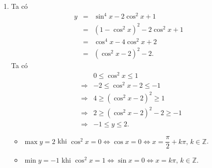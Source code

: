 \begin{ex}
{\begin{enumerate}
\begin{itemize}
			\end{itemize}
			 \item Ta có \allowdisplaybreaks
			\begin{eqnarray*}
				y& =& \sin^4 x - 2\cos^2  x + 1 \\
				&=& (1-\cos^2 x)^2 - 2\cos^2  x + 1\\
				& =& \cos^4 x - 4\cos^2 x + 2  \\
				&=& (\cos^2  x - 2)^2 - 2.
			\end{eqnarray*}
			 Ta có
			\allowdisplaybreaks 
			\begin{eqnarray*}
				&&0 \leq \cos^2 x \leq  1 \\
				&\Rightarrow& -2 \leq \cos^2 x - 2 \leq -1  \\
				&\Rightarrow& 4 \geq (\cos^2 x - 2)^2  \geq 1\\
				&\Rightarrow& 2 \geq (\cos^2 x - 2)^2 -  2 \geq -1 \\
				&\Rightarrow&  -1 \leq y \leq 2.
			\end{eqnarray*}
			\begin{itemize}
				\item $\max y=2$ khi $\cos^2x=0\Leftrightarrow\cos x=0\Leftrightarrow  x=\dfrac{\pi}{2}+k\pi,\,k\in\mathbb{Z}$.
				\item $\min y=-1$ khi $\cos^2x=1\Leftrightarrow\sin x=0\Leftrightarrow  x=k\pi,\, k\in\mathbb{Z}$.
			\end{itemize}
		\end{enumerate}
	} 
\end{ex}

